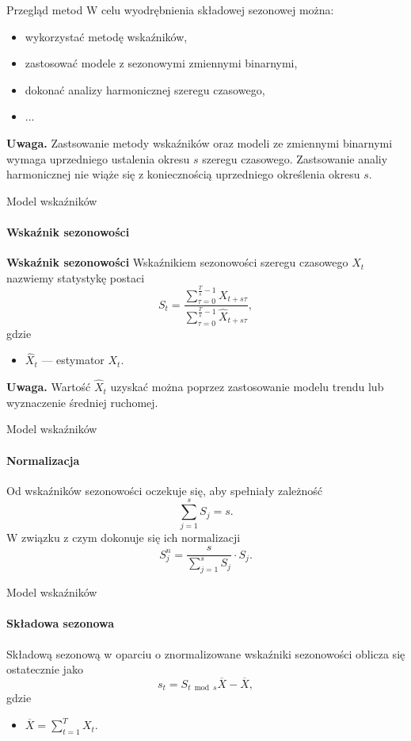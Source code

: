 \documentclass[a4paper, 11pt]{beamer}
\begin{document}
	\begin{frame}{Przegląd metod}
		W celu wyodrębnienia składowej sezonowej można:
		\begin{itemize}
			\item wykorzystać metodę wskaźników,
			\item zastosować modele z sezonowymi zmiennymi binarnymi,
			\item dokonać analizy harmonicznej szeregu czasowego,
			\item ...
		\end{itemize}

		\begin{alert}{\textbf{Uwaga.}}
			Zastsowanie metody wskaźników oraz modeli ze zmiennymi binarnymi wymaga
			uprzedniego ustalenia okresu $s$ szeregu czasowego. Zastsowanie analiy
			harmonicznej nie wiąże się z koniecznością uprzedniego określenia okresu
			$s.$
		\end{alert}
	\end{frame}
	
	\begin{frame}{Model wskaźników}
		\framesubtitle{Wskaźnik sezonowości}
		\begin{block}{\textbf{Wskaźnik sezonowości}}
			Wskaźnikiem sezonowości szeregu czasowego $X_t$ nazwiemy statystykę 
			postaci\[
				S_t = \frac{
					\sum_{\tau=0}^{\frac{T}{s}-1} X_{t + s \tau}
				}{
					\sum_{\tau=0}^{\frac{T}{s}-1} \hat{X}_{t + s \tau}
				},
			\] gdzie
			\begin{itemize}
				\item $\hat{X}_t$ --- estymator $X_t.$
			\end{itemize}
		\end{block}
		\begin{alert}{\textbf{Uwaga.}}
			Wartość $\hat{X}_t$ uzyskać można poprzez zastosowanie modelu trendu lub
			wyznaczenie średniej ruchomej.
		\end{alert}
	\end{frame}
	
	\begin{frame}{Model wskaźników}
		\framesubtitle{Normalizacja}
		Od wskaźników sezonowości oczekuje się, aby spełniały zależność \[
			\sum_{j=1}^{s} S_j = s.
		\]
		W związku z czym dokonuje się ich normalizacji \[
			S_j^n = \frac{s}{\sum_{j=1}^{s} S_j} \cdot S_j.
		\]
	\end{frame}
	
	\begin{frame}{Model wskaźników}
		\framesubtitle{Składowa sezonowa}
		Składową sezonową w oparciu o znormalizowane wskaźniki sezonowości
		oblicza się ostatecznie jako \[
			s_t = S_{t \bmod s} \overline{X} - \overline{X},
		\] gdzie
		\begin{itemize}
			\item $\overline{X} = \sum_{t=1}^{T} X_t.$
		\end{itemize}
	\end{frame}
	
\end{document}
